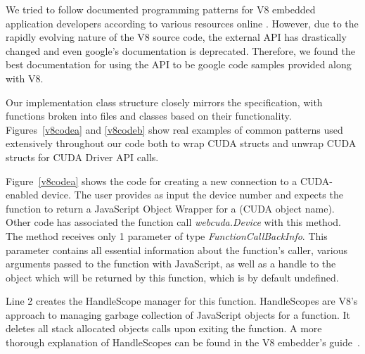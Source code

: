 We tried to follow documented programming patterns for V8 embedded application
developers according to various resources online \cite{embeddersGuide,
nodeJSDocumentation}. However, due to the rapidly evolving nature of the V8
source code, the external API has drastically changed and even google's
documentation \cite{embeddersGuide} is deprecated. Therefore, we found the best
documentation for using the API to be google code samples provided along with
V8.

\lstset{ language=C++, numbers=left, stepnumber=1, tabsize=1, keepspaces=false,
breaklines=true}
\begin{figure*}
	\begin{center}
		\small
		
\end{center}
\caption{Creating new \name Device Object}
\label{v8codea}
	\begin{center}
		\small
		
\end{center}
\caption{C++ Implementation of \namens's \textit{webcuda.free} method}
\label{v8codeb}

\end{figure*}

Our implementation class structure closely mirrors the specification, with
functions broken into files and classes based on their functionality.
Figures~\ref{v8codea} and \ref{v8codeb} show real examples of common patterns used
extensively throughout our code both to wrap CUDA structs and unwrap CUDA
structs for CUDA Driver API calls.  

Figure~\ref{v8codea} shows the code for creating a new connection to a
CUDA-enabled device. The user provides as input the device number and expects
the function to return a JavaScript Object Wrapper for a (CUDA object name).
Other code has associated the function call \textit{webcuda.Device} with this
method. The method receives only 1 parameter of type
\textit{FunctionCallBackInfo}. This parameter contains all essential information
about the function's caller, various arguments passed to the function with
JavaScript, as well as a handle to the object which will be returned by this
function, which is by default undefined. 

Line 2 creates the HandleScope manager for this function.  HandleScopes are V8's
approach to managing garbage collection of JavaScript objects for a function. It
deletes all stack allocated objects calls upon exiting the function.  A more
thorough explanation of HandleScopes can be found in the V8 embedder's
guide~\cite{embeddersGuide}.  


